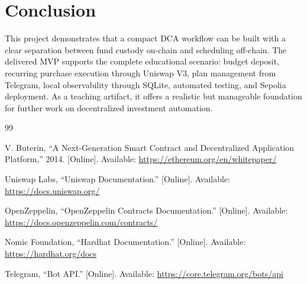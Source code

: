 \documentclass[conference]{IEEEtran}
\begin{document}
\section{Conclusion}
This project demonstrates that a compact DCA workflow can be built with a clear separation between fund custody on-chain and scheduling off-chain. The delivered MVP supports the complete educational scenario: budget deposit, recurring purchase execution through Uniswap V3, plan management from Telegram, local observability through SQLite, automated testing, and Sepolia deployment. As a teaching artifact, it offers a realistic but manageable foundation for further work on decentralized investment automation.

\begin{thebibliography}{99}

V. Buterin, ``A Next-Generation Smart Contract and Decentralized Application Platform,'' 2014. [Online]. Available: \url{https://ethereum.org/en/whitepaper/}

Uniswap Labs, ``Uniswap Documentation.'' [Online]. Available: \url{https://docs.uniswap.org/}

OpenZeppelin, ``OpenZeppelin Contracts Documentation.'' [Online]. Available: \url{https://docs.openzeppelin.com/contracts/}

Nomic Foundation, ``Hardhat Documentation.'' [Online]. Available: \url{https://hardhat.org/docs}

Telegram, ``Bot API.'' [Online]. Available: \url{https://core.telegram.org/bots/api}

\end{thebibliography}
\end{document}
